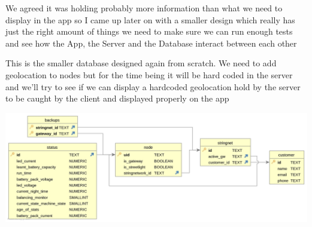 \documentclass[a4paper,12pt]{book}
\begin{document}
We agreed it was holding probably more information than what we need to display in the app so I came up later on with a smaller design which really has just the right amount of things we need to make sure we can run enough tests and see how the App, the Server and the Database interact between each other
\clearpage

This is the smaller database designed again from scratch. We need to add geolocation to nodes but for the time being it will be hard coded in the server and we'll try to see if we can display a hardcoded geolocation hold by the server to be caught by the client and displayed properly on the app

\noindent\includegraphics[width=14cm]{./SecondERSchemaGen2.jpg}

\printindex
\end{document}
